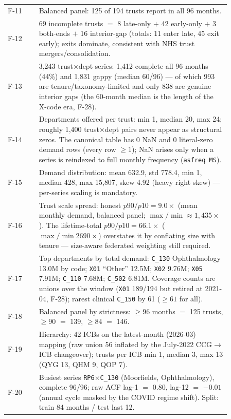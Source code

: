 \documentclass[11pt,a4paper]{article}
\begin{document}
\begin{longtable}{@{}l p{0.86\linewidth}@{}}
F-11 & Balanced panel: 125 of 194 trusts report in all 96 months. \\
F-12 & 69 incomplete trusts $=$ 8 late-only $+$ 42 early-only $+$ 3 both-ends $+$ 16 interior-gap (totals: 11 enter late, 45 exit early); exits dominate, consistent with NHS trust mergers/consolidation. \\
F-13 & 3{,}243 trust$\times$dept series: 1{,}412 complete all 96 months (44\%) and 1{,}831 gappy (median 60/96) --- of which 993 are tenure/taxonomy-limited and only 838 are genuine interior gaps (the 60-month median is the length of the X-code era, F-28). \\
F-14 & Departments offered per trust: min 1, median 20, max 24; roughly 1{,}400 trust$\times$dept pairs never appear as structural zeros. The canonical table has 0 NaN and 0 literal-zero demand rows (every row $\geq 1$); NaN arises only when a series is reindexed to full monthly frequency (\texttt{asfreq MS}). \\
F-15 & Demand distribution: mean 632.9, std 778.4, min 1, median 428, max 15{,}807, skew 4.92 (heavy right skew) --- per-series scaling is mandatory. \\
F-16 & Trust scale spread: honest $p90/p10 = 9.0\times$ (mean monthly demand, balanced panel; $\max/\min \approx 1{,}435\times$). The lifetime-total $p90/p10 = 66.1\times$ ($\max/\min 2690\times$) overstates it by conflating size with tenure --- size-aware federated weighting still required. \\
F-17 & Top departments by total demand: \texttt{C\_130} Ophthalmology 13.0M by code; \texttt{X01} ``Other'' 12.5M; \texttt{X02} 9.76M; \texttt{X05} 7.91M; \texttt{C\_110} 7.68M; \texttt{C\_502} 6.81M. Coverage counts are unions over the window (\texttt{X01} 189/194 but retired at 2021-04, F-28); rarest clinical \texttt{C\_150} by 61 ($\geq 61$ for all). \\
F-18 & Balanced panel by strictness: $\geq 96$ months $=$ 125 trusts, $\geq 90$ $=$ 139, $\geq 84$ $=$ 146. \\
F-19 & Hierarchy: 42 ICBs on the latest-month (2026-03) mapping (raw union 56 inflated by the July-2022 CCG$\rightarrow$ICB changeover); trusts per ICB min 1, median 3, max 13 (QYG 13, QHM 9, QOP 7). \\
F-20 & Busiest series \texttt{RP6}$\times$\texttt{C\_130} (Moorfields, Ophthalmology), complete 96/96; raw ACF lag-1 $=$ 0.80, lag-12 $=$ $-0.01$ (annual cycle masked by the COVID regime shift). Split: train 84 months / test last 12. \\

\end{longtable}
\end{document}
